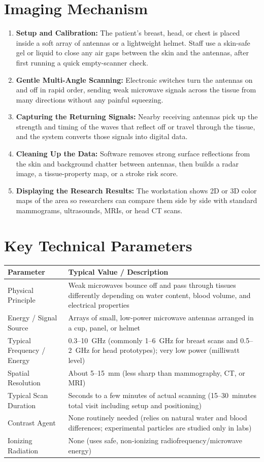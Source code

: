 \section{Imaging Mechanism}
\begin{enumerate}
  \item \textbf{Setup and Calibration:} The patient's breast, head, or chest is placed inside a soft array of antennas or a lightweight helmet. Staff use a skin-safe gel or liquid to close any air gaps between the skin and the antennas, after first running a quick empty-scanner check.
  \item \textbf{Gentle Multi-Angle Scanning:} Electronic switches turn the antennas on and off in rapid order, sending weak microwave signals across the tissue from many directions without any painful squeezing.
  \item \textbf{Capturing the Returning Signals:} Nearby receiving antennas pick up the strength and timing of the waves that reflect off or travel through the tissue, and the system converts those signals into digital data.
  \item \textbf{Cleaning Up the Data:} Software removes strong surface reflections from the skin and background chatter between antennas, then builds a radar image, a tissue-property map, or a stroke risk score.
  \item \textbf{Displaying the Research Results:} The workstation shows 2D or 3D color maps of the area so researchers can compare them side by side with standard mammograms, ultrasounds, MRIs, or head CT scans.
\end{enumerate}

\section{Key Technical Parameters}
\noindent
\begin{tabularx}{\textwidth}{@{}l X@{}}
\toprule
\textbf{Parameter} & \textbf{Typical Value / Description} \\
\midrule
Physical Principle & Weak microwaves bounce off and pass through tissues differently depending on water content, blood volume, and electrical properties \\
Energy / Signal Source & Arrays of small, low-power microwave antennas arranged in a cup, panel, or helmet \\
Typical Frequency / Energy & 0.3--10~GHz (commonly 1--6~GHz for breast scans and 0.5--2~GHz for head prototypes); very low power (milliwatt level) \\
Spatial Resolution & About 5--15~mm (less sharp than mammography, CT, or MRI) \\
Typical Scan Duration & Seconds to a few minutes of actual scanning (15--30~minutes total visit including setup and positioning) \\
Contrast Agent & None routinely needed (relies on natural water and blood differences; experimental particles are studied only in labs) \\
Ionizing Radiation & None (uses safe, non-ionizing radiofrequency/microwave energy) \\
\bottomrule
\end{tabularx}

